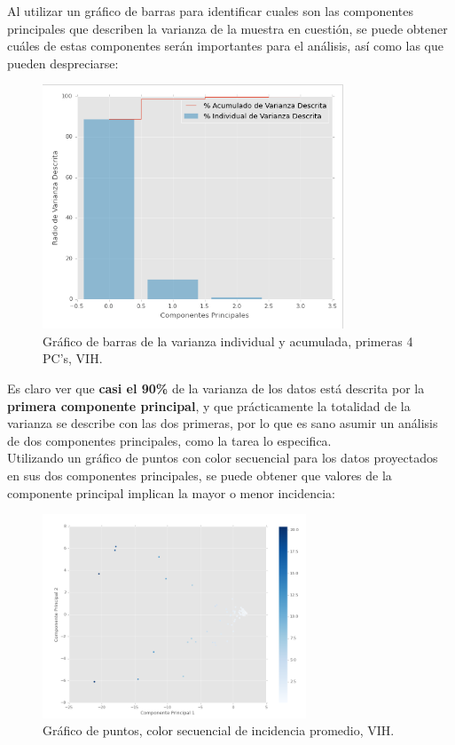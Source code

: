 \documentclass[letter, 10pt]{article}
\begin{document}
Al utilizar un gráfico de barras para identificar cuales son las componentes principales que describen la varianza de la muestra en cuestión, se puede obtener cuáles de estas componentes serán importantes para el análisis, así como las que pueden despreciarse:

\begin{figure}[H]
\begin{center}
\includegraphics[width=0.8\textwidth]{Images/2var.png}
\caption{Gráfico de barras de la varianza individual y acumulada, primeras 4 PC's, VIH.}
\end{center}
\end{figure}

Es claro ver que \textbf{casi el 90\%} de la varianza de los datos está descrita por la \textbf{primera componente principal}, y que prácticamente la totalidad de la varianza se describe con las dos primeras, por lo que es sano asumir un análisis de dos componentes principales, como la tarea lo especifica.\\

Utilizando un gráfico de puntos con color secuencial para los datos proyectados en sus dos componentes principales, se puede obtener que valores de la componente principal implican la mayor o menor incidencia:

\begin{figure}[H]
\begin{center}
\includegraphics[width=0.7\textwidth]{Images/3scatter1.png}
\caption{Gráfico de puntos, color secuencial de incidencia promedio, VIH.}
\end{center}
\end{figure}
\end{document}
